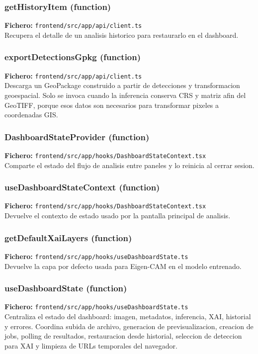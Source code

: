 \subsubsection*{getHistoryItem (function)}
\noindent\textbf{Fichero:} \texttt{frontend/src/app/api/client.ts}\\
Recupera el detalle de un analisis historico para restaurarlo en el dashboard.


\subsubsection*{exportDetectionsGpkg (function)}
\noindent\textbf{Fichero:} \texttt{frontend/src/app/api/client.ts}\\
Descarga un GeoPackage construido a partir de detecciones y transformacion geoespacial. Solo se invoca cuando la inferencia conserva CRS y matriz afin del GeoTIFF, porque esos datos son necesarios para transformar pixeles a coordenadas GIS.


\subsubsection*{DashboardStateProvider (function)}
\noindent\textbf{Fichero:} \texttt{frontend/src/app/hooks/DashboardStateContext.tsx}\\
Comparte el estado del flujo de analisis entre paneles y lo reinicia al cerrar sesion.


\subsubsection*{useDashboardStateContext (function)}
\noindent\textbf{Fichero:} \texttt{frontend/src/app/hooks/DashboardStateContext.tsx}\\
Devuelve el contexto de estado usado por la pantalla principal de analisis.


\subsubsection*{getDefaultXaiLayers (function)}
\noindent\textbf{Fichero:} \texttt{frontend/src/app/hooks/useDashboardState.ts}\\
Devuelve la capa por defecto usada para Eigen-CAM en el modelo entrenado.


\subsubsection*{useDashboardState (function)}
\noindent\textbf{Fichero:} \texttt{frontend/src/app/hooks/useDashboardState.ts}\\
Centraliza el estado del dashboard: imagen, metadatos, inferencia, XAI, historial y errores. Coordina subida de archivo, generacion de previsualizacion, creacion de jobs, polling de resultados, restauracion desde historial, seleccion de deteccion para XAI y limpieza de URLs temporales del navegador.


